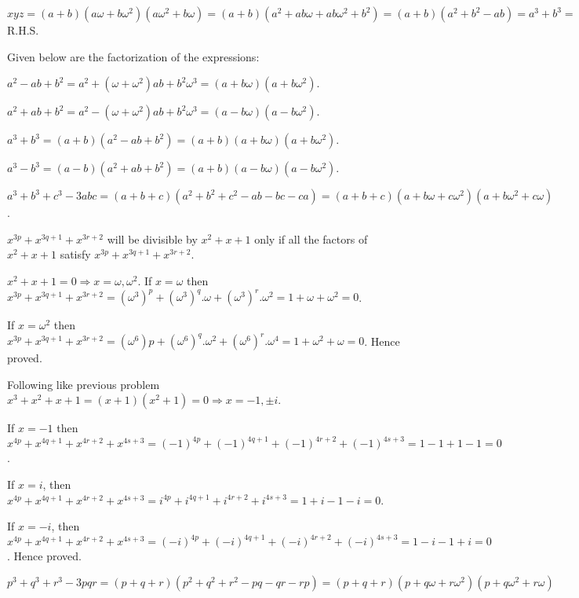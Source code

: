   $xyz = (a + b)(a\omega + b\omega^2)(a\omega^2 + b\omega) = (a + b)(a^2 + ab\omega + ab\omega^2 + b^2) = (a
  + b)(a^2 + b^2 - ab) = a^3 + b^3 =$ R.H.S.
\item Given below are the factorization of the expressions:
  \startitemize[i]
  \item $a^2 - ab + b^2 = a^2 + (\omega + \omega^2)ab + b^2\omega^3 = (a + b\omega)(a + b\omega^2)$.
  \item $a^2 + ab + b^2 = a^2 - (\omega + \omega^2)ab + b^2\omega^3 = (a - b\omega)(a - b\omega^2)$.
  \item $a^3 + b^3 = (a + b)(a^2 - ab + b^2) = (a + b)(a + b\omega)(a + b\omega^2)$.
  \item $a^3 - b^3 = (a - b)(a^2 + ab + b^2) = (a + b)(a - b\omega)(a - b\omega^2)$.
  \item $a^3 + b^3 + c^3 - 3abc = (a + b + c)(a^2 + b^2 + c^2 - ab - bc - ca) = (a + b + c)(a + b\omega +
    c\omega^2)(a + b\omega^2 + c\omega)$.
  \stopitemize
\item $x^{3p} + x^{3q + 1} + x^{3r + 2}$ will be divisible by $x^2 + x + 1$ only if all the factors of $x^2
  + x + 1$ satisfy $x^{3p} + x^{3q + 1} + x^{3r + 2}$.

  $x^2 + x + 1 = 0\Rightarrow x = \omega, \omega^2$. If $x = \omega$ then $x^{3p} + x^{3q + 1} + x^{3r + 2}
  = (\omega^3)^p + (\omega^3)^q.\omega + (\omega^3)^r.\omega^2 = 1 + \omega + \omega^2 = 0$.

  If $x = \omega^2$ then $x^{3p} + x^{3q + 1} + x^{3r + 2} = (\omega^6)p + (\omega^6)^q.\omega^2 +
  (\omega^6)^r.\omega^4 = 1 + \omega^2 + \omega = 0$. Hence proved.
\item Following like previous problem $x^3 + x^2 + x + 1 = (x + 1)(x^2 + 1) = 0 \Rightarrow x = -1, \pm i$.

  If $x = -1$ then $x^{4p} + x^{4q + 1} + x^{4r + 2} + x^{4s + 3} = (-1)^{4p} + (-1)^{4q + 1} + (-1)^{4r +
    2} + (-1)^{4s + 3} = 1 - 1 + 1 - 1 = 0$.

  If $x = i$, then $x^{4p} + x^{4q + 1} + x^{4r + 2} + x^{4s + 3} = i^{4p} + i^{4q + 1} + i^{4r + 2} + i^{4s
    + 3} = 1 + i - 1 - i = 0$.

  If $x = -i$, then $x^{4p} + x^{4q + 1} + x^{4r + 2} + x^{4s + 3} = (-i)^{4p} + (-i)^{4q + 1} + (-i)^{4r +
    2} + (-i)^{4s + 3} = 1 - i - 1 + i = 0$. Hence proved.
\item $p^3 + q^3 + r^3 - 3pqr = (p + q + r)(p^2 + q^2 + r^2 - pq - qr - rp) = (p + q + r)(p + q\omega +
  r\omega^2)(p + q\omega^2 + r\omega)$

